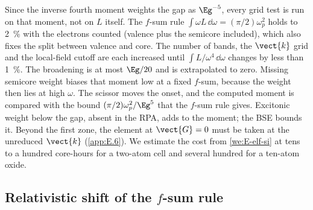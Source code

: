 Since the inverse fourth moment weights the gap as $\Eg^{-5}$, every grid test is run on that moment, not on $L$ itself. The $f$-sum rule $\int\omega L\,\dd\omega = (\pi/2)\omega_p^2$ holds to \SI{2}{\percent} with the electrons counted (valence plus the semicore included), which also fixes the split between valence and core. The number of bands, the $\vect{k}$ grid and the local-field cutoff are each increased until $\int L/\omega^4\,\dd\omega$ changes by less than \SI{1}{\percent}. The broadening is at most $\Eg/20$ and is extrapolated to zero. Missing semicore weight biases that moment low at a fixed $f$-sum, because the weight then lies at high $\omega$. The scissor moves the onset, and the computed moment is compared with the bound $(\pi/2)\omega_p^2/\Eg^5$ that the $f$-sum rule gives. Excitonic weight below the gap, absent in the RPA, adds to the moment; the BSE bounds it. Beyond the first zone, the element at $\vect{G} = 0$ must be taken at the unreduced $\vect{k}$ (\cref{app:E.6}). We estimate the cost from \cref{we:E-elf-si} at tens to a hundred core-hours for a two-atom cell and several hundred for a ten-atom oxide.

\subsection{Relativistic shift of the \texorpdfstring{$f$}{f}-sum rule}

